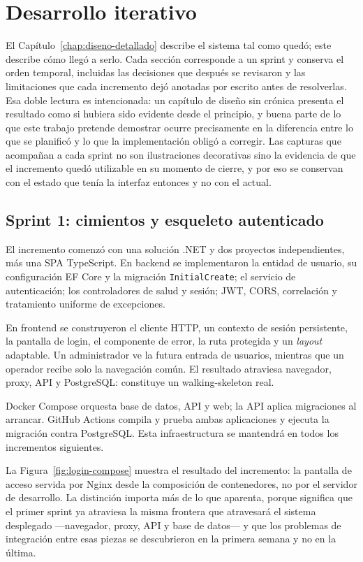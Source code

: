 \chapter{Desarrollo iterativo}
\label{chap:desarrollo-iterativo}

El Capítulo~\ref{chap:diseno-detallado} describe el sistema tal como quedó; este describe cómo llegó a serlo. Cada sección corresponde a un sprint y conserva el orden temporal, incluidas las decisiones que después se revisaron y las limitaciones que cada incremento dejó anotadas por escrito antes de resolverlas. Esa doble lectura es intencionada: un capítulo de diseño sin crónica presenta el resultado como si hubiera sido evidente desde el principio, y buena parte de lo que este trabajo pretende demostrar ocurre precisamente en la diferencia entre lo que se planificó y lo que la implementación obligó a corregir. Las capturas que acompañan a cada sprint no son ilustraciones decorativas sino la evidencia de que el incremento quedó utilizable en su momento de cierre, y por eso se conservan con el estado que tenía la interfaz entonces y no con el actual.

\section{Sprint 1: cimientos y esqueleto autenticado}

El incremento comenzó con una solución .NET y dos proyectos independientes, más una SPA TypeScript. En backend se implementaron la entidad de usuario, su configuración EF Core y la migración \texttt{InitialCreate}; el servicio de autenticación; los controladores de salud y sesión; JWT, CORS, correlación y tratamiento uniforme de excepciones.

En frontend se construyeron el cliente HTTP, un contexto de sesión persistente, la pantalla de login, el componente de error, la ruta protegida y un \emph{layout} adaptable. Un administrador ve la futura entrada de usuarios, mientras que un operador recibe solo la navegación común. El resultado atraviesa navegador, proxy, API y PostgreSQL: constituye un \gls{walking-skeleton} real.

Docker Compose orquesta base de datos, API y web; la API aplica migraciones al arrancar. GitHub Actions compila y prueba ambas aplicaciones y ejecuta la migración contra PostgreSQL. Esta infraestructura se mantendrá en todos los incrementos siguientes.

La Figura~\ref{fig:login-compose} muestra el resultado del incremento: la pantalla de acceso servida por Nginx desde la composición de contenedores, no por el servidor de desarrollo. La distinción importa más de lo que aparenta, porque significa que el primer sprint ya atraviesa la misma frontera que atravesará el sistema desplegado ---navegador, proxy, API y base de datos--- y que los problemas de integración entre esas piezas se descubrieron en la primera semana y no en la última.


